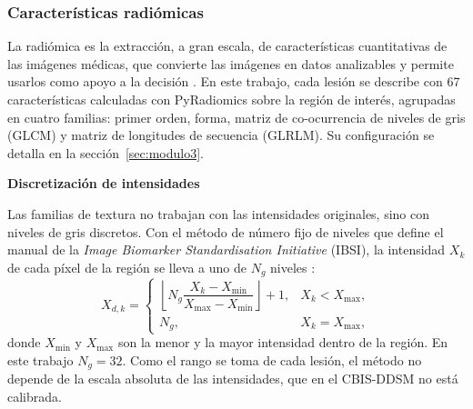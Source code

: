 
\subsubsection{Características radiómicas}
\label{sec:radiomica}

La radiómica es la extracción, a gran escala, de características cuantitativas de las imágenes médicas, que convierte las imágenes en datos analizables y permite usarlos como apoyo a la decisión \cite{Gillies2016Radiomics}. En este trabajo, cada lesión se describe con 67 características calculadas con PyRadiomics \cite{vanGriethuysen2017} sobre la región de interés, agrupadas en cuatro familias: primer orden, forma, matriz de co-ocurrencia de niveles de gris (GLCM) y matriz de longitudes de secuencia (GLRLM). Su configuración se detalla en la sección~\ref{sec:modulo3}.

\textbf{Discretización de intensidades}

Las familias de textura no trabajan con las intensidades originales, sino con niveles de gris discretos. Con el método de número fijo de niveles que define el manual de la \textit{Image Biomarker Standardisation Initiative} (IBSI), la intensidad $X_k$ de cada píxel de la región se lleva a uno de $N_g$ niveles \cite{Zwanenburg2020IBSI}:
\begin{equation}
  X_{d,k} =
  \begin{cases}
    \left\lfloor N_g \dfrac{X_k - X_{\min}}{X_{\max} - X_{\min}} \right\rfloor + 1, & X_k < X_{\max},\\[8pt]
    N_g, & X_k = X_{\max},
  \end{cases}
  \label{eq:discretizacion}
\end{equation}
donde $X_{\min}$ y $X_{\max}$ son la menor y la mayor intensidad dentro de la región. En este trabajo $N_g = 32$. Como el rango se toma de cada lesión, el método no depende de la escala absoluta de las intensidades, que en el CBIS-DDSM no está calibrada.

